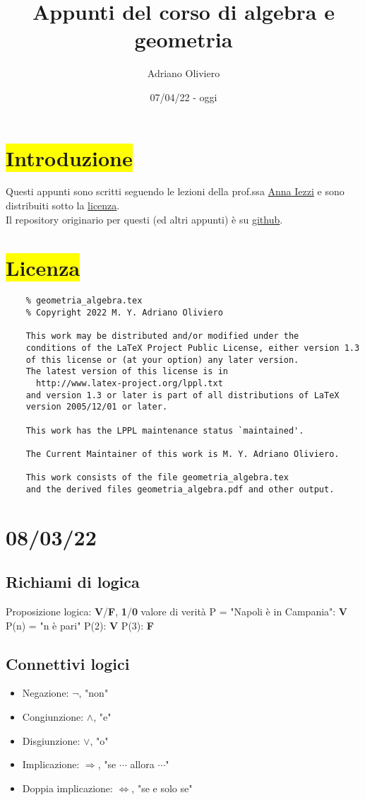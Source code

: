 \documentclass{article}
\title{Appunti del corso di algebra e geometria}
\author{Adriano Oliviero}
\date{07/04/22 - oggi}
\newcommand{\hl}[1]{\colorbox{yellow}{#1}}
\begin{document}
\maketitle
\setcounter{tocdepth}{2}
\renewcommand*\contentsname{Indice}
\tableofcontents
\newpage
\section*{\hl{Introduzione}}
Questi appunti sono scritti seguendo le lezioni della prof.ssa \href{https://aiezzi.it/}{Anna Iezzi} e sono distribuiti sotto la \hyperref[sec:Licenza]{licenza}.\\
Il repository originario per questi (ed altri appunti) è su \href{https://github.com/TheDarkBug/notes}{github}.
\section*{\hl{Licenza}}
\label{sec:Licenza}
\begin{verbatim}
	% geometria_algebra.tex
	% Copyright 2022 M. Y. Adriano Oliviero
	
	This work may be distributed and/or modified under the
	conditions of the LaTeX Project Public License, either version 1.3
	of this license or (at your option) any later version.
	The latest version of this license is in
	  http://www.latex-project.org/lppl.txt
	and version 1.3 or later is part of all distributions of LaTeX
	version 2005/12/01 or later.
	
	This work has the LPPL maintenance status `maintained'.
	
	The Current Maintainer of this work is M. Y. Adriano Oliviero.
	
	This work consists of the file geometria_algebra.tex
	and the derived files geometria_algebra.pdf and other output.
\end{verbatim}
\section{08/03/22}
\subsection{Richiami di logica}
Proposizione logica: \textbf{V}/\textbf{F}, \textbf{1}/\textbf{0} valore di verità
P = "Napoli è in Campania": \textbf{V}
P(n) = "n è pari"
P(2): \textbf{V}
P(3): \textbf{F}
\subsection{Connettivi logici}
\begin{itemize}
	\item Negazione: $\neg$, "non"
	\item Congiunzione: $\wedge$, "e"
	\item Disgiunzione: $\vee$, "o"
	\item Implicazione: $\Rightarrow$, "se $\cdots$ allora $\cdots$"
	\item Doppia implicazione: $\Leftrightarrow$, "se e solo se"
\end{itemize}
\end{document}
